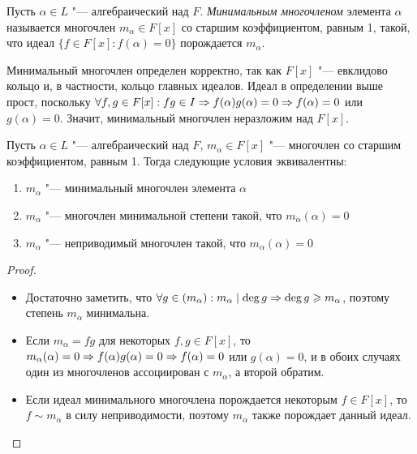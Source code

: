 \begin{definition}
	Пусть $\alpha \in L$ "--- алгебраический над $F$. \textit{Минимальным многочленом} элемента $\alpha$ называется многочлен $m_\alpha \in F[x]$ со старшим коэффициентом, равным 1, такой, что идеал $\{f \in F[x]: f(\alpha) = 0\}$ порождается $m_\alpha$.
\end{definition}

\begin{note}
	Минимальный многочлен определен корректно, так как $F[x]$ "--- евклидово кольцо и, в частности, кольцо главных идеалов. Идеал в определении выше прост, поскольку $\forall f, g \in F[x]: fg \in I \Rightarrow f(\alpha)g(\alpha) = 0 \Rightarrow f(\alpha) = 0$ или $g(\alpha) = 0$. Значит, минимальный многочлен неразложим над $F[x]$.
\end{note}

\begin{proposition}
	Пусть $\alpha \in L$ "--- алгебраический над $F$, $m_\alpha \in F[x]$ "--- многочлен со старшим коэффициентом, равным 1. Тогда следующие условия эквивалентны:
	\begin{enumerate}
		\item $m_\alpha$ "--- минимальный многочлен элемента $\alpha$
		\item $m_\alpha$ "--- многочлен минимальной степени такой, что $m_\alpha(\alpha) = 0$
		\item $m_\alpha$ "--- неприводимый многочлен такой, что $m_\alpha(\alpha) = 0$
	\end{enumerate}
\end{proposition}

\begin{proof}~
	\begin{itemize}
		\item{}Достаточно заметить, что $\forall g \in (m_\alpha): m_\alpha \mid \deg{g} \Rightarrow \deg{g} \geqslant m_\alpha$, поэтому степень $m_\alpha$ минимальна.
		\item{}Если $m_\alpha = fg$ для некоторых $f, g \in F[x]$, то $m_\alpha(\alpha) = 0 \ra f(\alpha)g(\alpha) = 0 \hm\ra f(\alpha) = 0$ или $g(\alpha) = 0$, и в обоих случаях один из многочленов ассоциирован с $m_\alpha$, а второй обратим.
		\item{}Если идеал минимального многочлена порождается некоторым $f \in F[x]$, то $f \sim m_\alpha$ в силу неприводимости, поэтому $m_\alpha$ также порождает данный идеал.\qedhere
	\end{itemize}
\end{proof}

